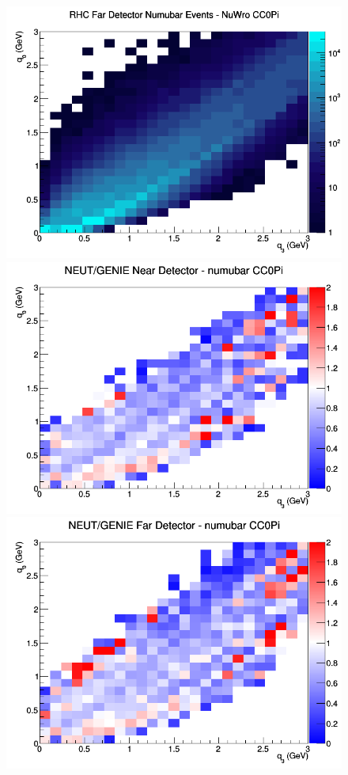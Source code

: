 \documentclass[12pt]{article}
\begin{document}
\begin{figure}[h]
\endminipage
{}
\includegraphics[width=\linewidth]{eff_q0_q3/LAr/CC0Pi_RHC_FD_numubar_q3_q0_NuWro.png}
\endminipage
\newline
{}
\includegraphics[width=\linewidth]{eff_q0_q3/LAr/ratios/CC0Pi_NEUT_GENIE_numubar_near_q3_q0.png}
\endminipage
{}
\includegraphics[width=\linewidth]{eff_q0_q3/LAr/ratios/CC0Pi_NEUT_GENIE_numubar_far_q3_q0.png}

\end{figure}
\end{document}
